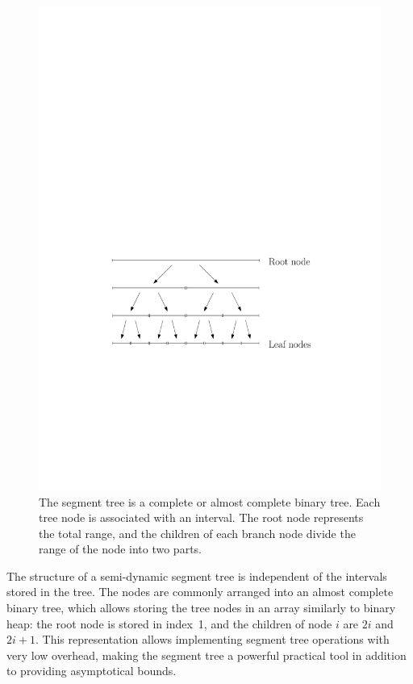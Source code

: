 \documentclass[english,gradu]{tktltiki2018}
\begin{document}
\begin{figure}\centering
	\includegraphics[scale=0.7,page=1]{fig/segtree}
	\caption{The segment tree is a complete or almost complete binary tree.
	Each tree node is associated with an interval.
	The root node represents the total range, and the children of each branch node divide the range of the node into two parts.}\label{fig:segtree}
\end{figure}

The structure of a semi-dynamic segment tree is independent of the intervals stored in the tree.
The nodes are commonly arranged into an almost complete binary tree, which allows storing the tree nodes in an array similarly to binary heap:
the root node is stored in index~1, and the children of node $i$ are $2i$ and $2i+1$.
This representation allows implementing segment tree operations with very low overhead, making the segment tree a powerful practical tool in addition to providing asymptotical bounds.
\end{document}
